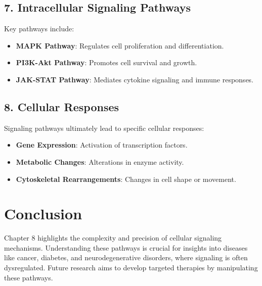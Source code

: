 \documentclass[12pt]{article}
\begin{document}
\subsection*{7. Intracellular Signaling Pathways}
Key pathways include:
\begin{itemize}
    \item \textbf{MAPK Pathway}: Regulates cell proliferation and differentiation.
    \item \textbf{PI3K-Akt Pathway}: Promotes cell survival and growth.
    \item \textbf{JAK-STAT Pathway}: Mediates cytokine signaling and immune responses.
\end{itemize}

\subsection*{8. Cellular Responses}
Signaling pathways ultimately lead to specific cellular responses:
\begin{itemize}
    \item \textbf{Gene Expression}: Activation of transcription factors.
    \item \textbf{Metabolic Changes}: Alterations in enzyme activity.
    \item \textbf{Cytoskeletal Rearrangements}: Changes in cell shape or movement.
\end{itemize}

\section*{Conclusion}
Chapter 8 highlights the complexity and precision of cellular signaling mechanisms. Understanding these pathways is crucial for insights into diseases like cancer, diabetes, and neurodegenerative disorders, where signaling is often dysregulated. Future research aims to develop targeted therapies by manipulating these pathways.
\end{document}
